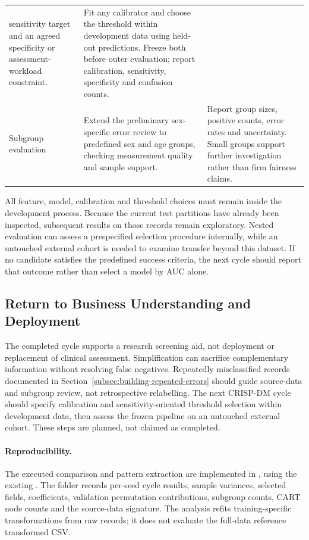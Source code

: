 \begin{table}[htbp]
\begin{tabularx}{\textwidth}{@{}p{2.3cm}XX@{}}
sensitivity target and an agreed specificity or assessment-workload
constraint. &
Fit any calibrator and choose the threshold within development data using
held-out predictions. Freeze both before outer evaluation; report
calibration, sensitivity, specificity and confusion counts. \\
\addlinespace
Subgroup evaluation &
Extend the preliminary sex-specific error review to predefined sex and age
groups, checking measurement quality and sample support. &
Report group sizes, positive counts, error rates and uncertainty. Small
groups support further investigation rather than firm fairness claims. \\
\bottomrule
\end{tabularx}
\end{table}

All feature, model, calibration and threshold choices must remain inside the
development process. Because the current test partitions have already been
inspected, subsequent results on those records remain exploratory. Nested
evaluation can assess a prespecified selection procedure internally, while an
untouched external cohort is needed to examine transfer beyond this dataset.
If no candidate satisfies the predefined success criteria, the next cycle
should report that outcome rather than select a model by AUC alone.

\subsection{Return to Business Understanding and Deployment}
\label{subsec:business-objective-evaluation}

The completed cycle supports a research screening aid, not deployment or replacement of clinical assessment. Simplification can sacrifice complementary information without resolving false negatives. Repeatedly misclassified records documented in Section~\ref{subsec:building-repeated-errors} should guide source-data and subgroup review, not retrospective relabelling. The next CRISP-DM cycle should specify calibration and sensitivity-oriented threshold selection within development data, then assess the frozen pipeline on an untouched external cohort. These steps are planned, not claimed as completed.

\paragraph{Reproducibility.}
The executed comparison and pattern extraction are implemented in
\protect{}, using the existing \protect{}.
The folder \protect{} records per-seed cycle results,
sample variances, selected fields, coefficients, validation permutation
contributions, subgroup counts, CART node counts and the source-data signature.
The analysis refits training-specific transformations from raw records; it does
not evaluate the full-data reference transformed CSV.

